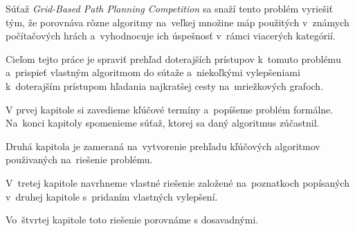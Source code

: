 Súťaž {\sl Grid-Based Path Planning Competition}
 \cite{sturtevantgppc} sa snaží tento problém vyriešiť tým, že porovnáva rôzne algoritmy na~veľkej množine máp
použitých v~známych počítačových hrách a~vyhodnocuje ich úspešnosť v~rámci viacerých kategórií.

Cieľom tejto práce je spraviť prehľad doterajších prístupov k~tomuto problému a~prispieť vlastným algoritmom do sútaže a~niekoľkými vylepšeniami k~doterajším prístupom hľadania najkratšej cesty na~mriežkových grafoch.

V prvej kapitole si zavedieme kľúčové termíny a~popíšeme problém formálne. Na~konci kapitoly spomenieme súťaž, ktorej sa daný algoritmus zúčastnil.

Druhá kapitola je zameraná na~vytvorenie prehľadu kľúčových algoritmov použivaných na~riešenie problému.

V~tretej kapitole navrhneme vlastné riešenie založené na~poznatkoch popísaných v~druhej kapitole s~pridaním vlastných vylepšení.

Vo~štvrtej kapitole toto riešenie porovnáme s dosavadnými.


